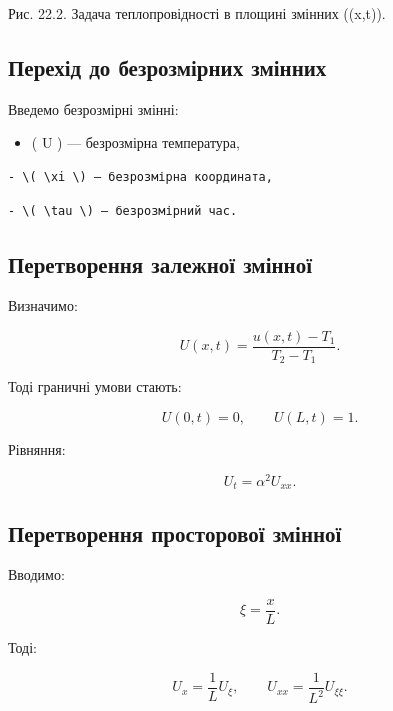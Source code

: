 \documentclass[
  ukrainian,
]{article}
\providecommand{\tightlist}{%
  \setlength{\itemsep}{0pt}\setlength{\parskip}{0pt}}
\begin{document}
Рис. 22.2. Задача теплопровідності в площині змінних ((x,t)).

\subsection{Перехід до безрозмірних
змінних}\label{ux43fux435ux440ux435ux445ux456ux434-ux434ux43e-ux431ux435ux437ux440ux43eux437ux43cux456ux440ux43dux438ux445-ux437ux43cux456ux43dux43dux438ux445}

Введемо безрозмірні змінні:

\begin{itemize}
\tightlist
\item
  ( U ) --- безрозмірна температура,
\end{itemize}

\begin{verbatim}
- \( \xi \) — безрозмірна координата,
\end{verbatim}

\begin{verbatim}
- \( \tau \) — безрозмірний час.
\end{verbatim}

\subsection{Перетворення залежної
змінної}\label{ux43fux435ux440ux435ux442ux432ux43eux440ux435ux43dux43dux44f-ux437ux430ux43bux435ux436ux43dux43eux457-ux437ux43cux456ux43dux43dux43eux457}

Визначимо:

\[
U(x,t) = \frac{u(x,t) - T_1}{T_2 - T_1}.
\]

Тоді граничні умови стають:

\[
U(0,t)=0, \qquad U(L,t)=1.
\]

Рівняння:

\[
U_t = \alpha^2 U_{xx}.
\]

\subsection{Перетворення просторової
змінної}\label{ux43fux435ux440ux435ux442ux432ux43eux440ux435ux43dux43dux44f-ux43fux440ux43eux441ux442ux43eux440ux43eux432ux43eux457-ux437ux43cux456ux43dux43dux43eux457}

Вводимо:

\[
\xi = \frac{x}{L}.
\]

Тоді:

\[
U_x = \frac{1}{L} U_\xi, \qquad U_{xx} = \frac{1}{L^2} U_{\xi\xi}.
\]
\end{document}
